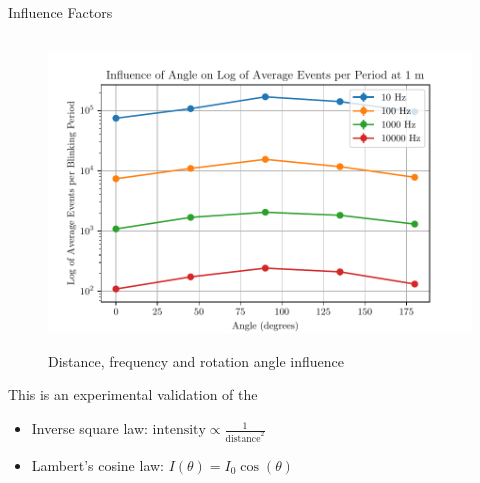 \documentclass{beamer}
\begin{document}
\begin{frame}{Influence Factors}
\begin{columns}[T]
    \begin{column}{0.48\textwidth}
        \vspace{-0.3cm}
        \begin{figure}[H]
            \centering
            \includegraphics[width=\textwidth]{../fig/semestral/angle2.pdf}
            \label{fig:rotation_influence}
            \caption{Distance, frequency and rotation angle influence}
        \end{figure}
        
        \tiny{
            This is an experimental validation of the
            \begin{itemize}
                \item Inverse square law: $\text{intensity} \propto \frac{1}{\text{distance}^2}$
                \item Lambert's cosine law: $I(\theta) = I_0\cos(\theta)$
            \end{itemize}
        }
    \end{column}
\end{columns}

\end{frame}

\end{document}
